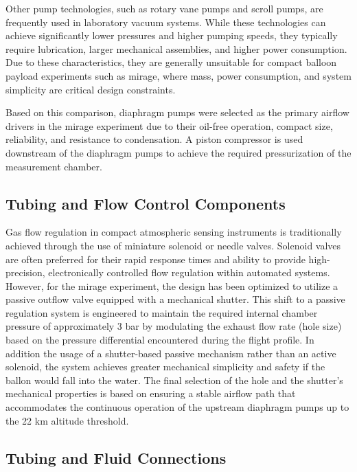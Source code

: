 \documentclass[
  a4paper,
  11pt,
  openany,
  parskip,
  toc=totoc,
  listof=totoc,
  bibliography=totoc
]{scrreprt}
\begin{document}
Other pump technologies, such as rotary vane pumps and scroll pumps, are frequently used in laboratory vacuum systems. While these technologies can achieve significantly lower pressures and higher pumping speeds, they typically require lubrication, larger mechanical assemblies, and higher power consumption. Due to these characteristics, they are generally unsuitable for compact balloon payload experiments such as \gls{mirage}, where mass, power consumption, and system simplicity are critical design constraints.

Based on this comparison, diaphragm pumps were selected as the primary airflow drivers in the \gls{mirage} experiment due to their oil-free operation, compact size, reliability, and resistance to condensation. A piston compressor is used downstream of the diaphragm pumps to achieve the required pressurization of the measurement chamber.

\subsection{Tubing and Flow Control Components}

Gas flow regulation in compact atmospheric sensing instruments is traditionally achieved through the use of miniature solenoid or needle valves. Solenoid valves are often preferred for their rapid response times and ability to provide high-precision, electronically controlled flow regulation within automated systems.
However, for the \gls{mirage} experiment, the design has been optimized to utilize a passive outflow valve equipped with a mechanical shutter. This shift to a passive regulation system is engineered to maintain the required internal chamber pressure of approximately 3 bar by modulating the exhaust flow rate (hole size) based on the pressure differential encountered during the flight profile. In addition the usage of a shutter-based passive mechanism rather than an active solenoid, the system achieves greater mechanical simplicity and safety if the ballon would fall into the water.
The final selection of the hole and the shutter's mechanical properties is based on ensuring a stable airflow path that accommodates the continuous operation of the upstream diaphragm pumps up to the 22 km altitude threshold.

\subsection{Tubing and Fluid Connections}
\end{document}
